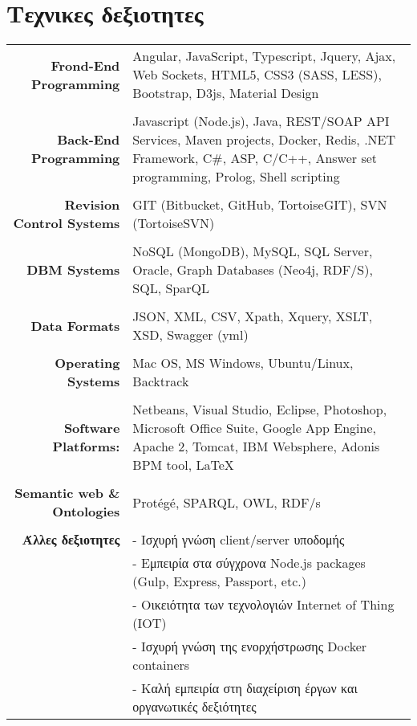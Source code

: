 \documentclass[11pt]{article}
\begin{document}
\section{Τεχνικες δεξιοτητες}
\begin{longtable}{rp{12cm}}
\textbf{Frond-End Programming} & Angular, JavaScript, Typescript, Jquery, Ajax, Web Sockets, HTML5, CSS3 (SASS, LESS), Bootstrap, D3js, Material Design\\

\\\textbf{Back-End Programming} & Javascript (Node.js), Java, REST/SOAP API Services, Maven projects, Docker, Redis, .NET Framework, C\#, ASP, C/C++, Answer set programming, Prolog, Shell scripting  \\

\\\textbf{Revision Control Systems} & GIT (Bitbucket, GitHub, TortoiseGIT), SVN (TortoiseSVN) \\

\\\textbf{DBM Systems} & NoSQL (MongoDB), MySQL, SQL Server, Oracle, Graph Databases (Neo4j, RDF/S), SQL, SparQL  \\

\\\textbf{Data Formats} & JSON, XML, CSV, Xpath, Xquery, XSLT, XSD, Swagger (yml)\\

\\\textbf{Operating Systems} & Mac OS, MS Windows, Ubuntu/Linux, Backtrack\\

\\\textbf{Software Platforms:} & Netbeans, Visual Studio, Eclipse, Photoshop, Microsoft Office Suite, Google App Engine, Apache 2, Tomcat, IBM Websphere, Adonis BPM tool, \LaTeX \\


\\\textbf{Semantic web \& Ontologies} & Protégé, SPARQL, OWL, RDF/s\\

\\\textbf{Άλλες δεξιοτητες} & - Ισχυρή γνώση client/server υποδομής\\
& - Εμπειρία στα σύγχρονα Node.js packages (Gulp, Express, Passport, etc.) \\
& - Οικειότητα των τεχνολογιών Internet of Thing (IOT) \\
& - Ισχυρή γνώση της ενορχήστρωσης Docker containers\\
& - Καλή εμπειρία στη διαχείριση έργων και οργανωτικές δεξιότητες \\

\end{longtable}
\end{document}
